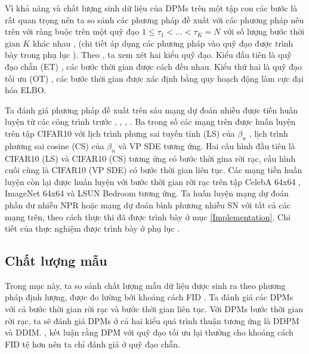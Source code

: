 \documentclass[14pt, a4paper]{article}
\numberwithin{equation}{section}
\numberwithin{figure}{section}
\numberwithin{dl}{section}
\numberwithin{md}{section}
\numberwithin{bd}{section}
\numberwithin{dn}{section}
\numberwithin{hq}{section}
\begin{document}
    Vì khả năng và chất lượng sinh dữ liệu của DPMs trên một tập con các bước là rất quan trọng nên ta so sánh các phương pháp đề xuất với các phương pháp nêu trên với ràng buộc trên một quỹ đạo
    $1 \leq \tau_1 < \dots < \tau_K = N$ với số lượng bước thời gian $K$ khác nhau \cite{song2020denoising}, \cite{bao2021analytic} (chi tiết áp dụng các phương pháp vào quỹ đạo được trình bày trong phụ lục ).
    Theo \cite{bao2021analytic}, ta xem xét hai kiểu quỹ đạo. Kiểu đầu tiên là quỹ đạo chẵn (ET) \cite{nichol2021improved}, các bước thời gian được cách đều nhau. Kiểu thứ hai là quỹ đạo tối ưu (OT) \cite{watson2021learning}, 
    các bước thời gian được xác định bằng quy hoạch động làm cực đại hóa ELBO.

    Ta đánh giá phương pháp đề xuất trên sáu mạng dự đoán nhiễu được tiền huấn luyện từ các công trình trước \cite{ho2020denoising}, \cite{song2020denoising}, \cite{nichol2021improved}, \cite{bao2021analytic}.
    Ba trong số các mạng trên được huấn luyện trên tập CIFAR10 \cite{krizhevsky2009learning} với lịch trình phưng sai tuyến tính (LS) của $\beta_n$ \cite{ho2020denoising},
    lịch trình phương sai cosine (CS) của $\beta_n$ \cite{nichol2021improved} và VP SDE \cite{song2020score} tương ứng.
    Hai cấu hình đầu tiên là CIFAR10 (LS) và CIFAR10 (CS) tương ứng có bước thời gina rời rạc, cấu hình cuối cùng là CIFAR10 (VP SDE) có bước thời gian liên tục.
    Các mạng tiền huấn luyện còn lại được huấn luyện với bước thời gian rời rạc trên tập CelebA 64x64 \cite{liu2015deep}, ImageNet 64x64 \cite{deng2009imagenet} và LSUN Bedroom \cite{yu2015lsun} tương ứng.
    Ta huấn luyện mạng dự đoán phần dư nhiễu NPR hoặc mạng dự đoán bình phương nhiễu SN với tất cả các mạng trên, theo cách thực thi đã được trình bày ở mục \ref{Implementation}.
    Chi tiết của thực nghiệm được trình bày ở phụ lục .

    \subsection{Chất lượng mẫu}

    Trong mục này, ta so sánh chất lượng mẫu dữ liệu được sinh ra theo phương pháp định lượng, được đo lường bởi khoảng cách FID \cite{heusel2017gans}.
    Ta đánh giá các DPMs với cả bước thời gian rời rạc và bước thời gian liên tục. Với DPMs bước thời gian rời rạc, ta sẽ đánh giá DPMs ở cả hai kiểu quá trình thuận tương ứng là DDPM và DDIM.
    \cite{watson2021learning}, \cite{bao2021analytic} kết luận rằng DPM với quỹ đạo tối ưu lại thường cho khoảng cách FID tệ hơn nên ta chỉ đánh giá ở quỹ đạo chẵn.

    

    \newpage
    \printbibliography[title={TÀI LIỆU THAM KHẢO}]
\end{document}
